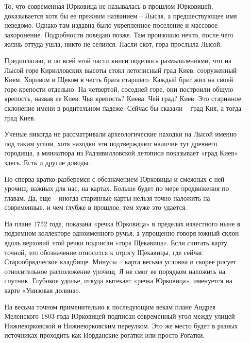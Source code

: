 То, что современная Юрковица не называлась в прошлом Юрковицей, доказывается хотя бы ее прежним названием – Лысая, а предшествующее имя неведомо. Однако там издавна было укрепленное поселение и массовое захоронение. Подробности поведаю позже. Там произошло нечто, после чего жизнь оттуда ушла, никто не селился. Пасли скот, гора прослыла Лысой.

Предполагаю, и по всей этой части книги поделюсь размышлениями, что на Лысой горе Кирилловских высоты стоял летописный град Киев, сооруженный Кием, Хоривом и Щеком в честь брата старшего. Каждый брат жил на своей горе-крепости отдельно. На четвертой, соседней горе, они построили общую крепость, назвав ее Киев. Чья крепость? Киева. Чей град? Киев. Это старинное склонение имени в родительном падеже. Сейчас бы сказали – град Кия, а тогда – град Киев.

Ученые никогда не рассматривали археологические находки на Лысой именно под таким углом, хотя находки эти подтверждают наличие тут древнего городища, а миниатюра из Радзивилловской летописи показывает «град Киев» здесь. Есть и другие доводы.

Но сперва кратко разберемся с обозначением Юрковицы и смежных с ней урочищ, важных для нас, на картах. Больше будет по мере продвижения по главам. Да, еще – иногда старинные карты нельзя точно наложить на современные, и чем глубже в прошлое, тем хуже это удается.

На плане 1752 года, показана «речка Юрковица» в пределах известного ныне в подземном коллекторе одноименного ручья, а упрощенно говоря южный склон вдоль верховий этой речки подписан «гора Щекавица». Если считать карту точной, это обозначение относится к отрогу Щекавицы, где сейчас Старообрядческое кладбище. Минусы – карта весьма условна и скорее рисует относительное расположение урочищ. Я не смог ее порядком наложить на спутник. Глубокое удолье, откуда вытекает «речка Юрковица», именуется на карте «Унизовая долина».

На весьма точном применительно к последующим векам плане Андрея Меленского 1803 года Юрковицей подписан современный угол между улицей Нижнеюрковской и Нижнеюрковским переулком. Это же место будет в разных источниках проходить как Иорданские рогатки или просто Рогатки.


